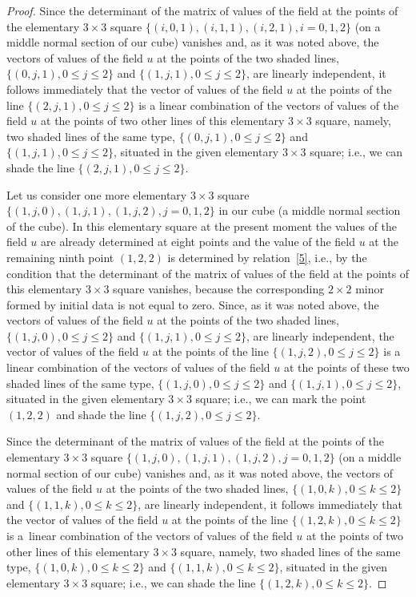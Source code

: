 \documentclass[11pt]{article}
\begin{document}
\begin{proof}
Since the determinant of the matrix of values of the f\/ield at the
points of the elementary $3 \times 3$ square $\{(i, 0, 1), (i, 1,
1), (i, 2, 1), i = 0, 1, 2\}$ (on a middle normal section of our
cube) vanishes and, as it was noted above, the vectors of values of
the f\/ield $u$ at the points of the two shaded lines, $\{(0, j, 1), 0
\leq j \leq 2\}$ and $\{(1, j, 1), 0 \leq j \leq 2\}$, are linearly
independent, it follows immediately that the vector of values of the
f\/ield $u$ at the points of the line $\{(2, j, 1), 0 \leq j \leq 2\}$
is a linear combination of the vectors of values of the f\/ield $u$ at
the points of two other lines of this elementary $3 \times 3$
square, namely, two shaded lines of the same type, $\{(0, j, 1), 0
\leq j \leq 2\}$ and $\{(1, j, 1), 0 \leq j \leq 2\}$, situated in
the given elementary $3 \times 3$ square; i.e., we can shade the
line $\{(2, j, 1), 0 \leq j \leq 2\}$.


Let us consider one more elementary $3 \times 3$ square $\{(1, j,
0), (1, j, 1), (1, j, 2), j = 0, 1, 2\}$ in our cube (a middle
normal section of the cube). In this elementary square at the
present moment the values of the f\/ield $u$ are already determined at
eight points and the value of the f\/ield $u$ at the remaining ninth
point $(1, 2, 2)$ is determined by relation~\eqref{5}, i.e.,
by the condition that the determinant of the matrix of values of the
f\/ield at the points of this elementary $3 \times 3$ square vanishes,
because the corresponding $2 \times 2$ minor formed by initial data
is not equal to zero. Since, as it was noted above, the vectors of
values of the f\/ield $u$ at the points of the two shaded lines,
$\{(1, j, 0), 0 \leq j \leq 2\}$ and $\{(1, j, 1), 0 \leq j \leq
2\}$, are linearly independent, the vector of values of the f\/ield
$u$ at the points of the line $\{(1, j, 2), 0 \leq j \leq 2\}$ is a
linear combination of the vectors of values of the f\/ield $u$ at the
points of these two shaded lines of the same type, $\{(1, j, 0), 0
\leq j \leq 2\}$ and $\{(1, j, 1), 0 \leq j \leq 2\}$, situated in
the given elementary $3 \times 3$ square; i.e., we can mark the
point $(1, 2, 2)$ and shade the line $\{(1, j, 2), 0 \leq j \leq
2\}$.


Since the determinant of the matrix of values of the f\/ield at the
points of the elementary $3 \times 3$ square $\{(1, j, 0), (1, j,
1), (1, j, 2), j = 0, 1, 2\}$ (on a middle normal section of our
cube) vanishes and, as it was noted above, the vectors of values of
the f\/ield $u$ at the points of the two shaded lines, $\{(1, 0, k), 0
\leq k \leq 2\}$ and $\{(1, 1, k), 0 \leq k \leq 2\}$, are linearly
independent, it follows immediately that the vector of values of the
f\/ield $u$ at the points of the line $\{(1, 2, k), 0 \leq k \leq 2\}$
is a~linear combination of the vectors of values of the f\/ield $u$ at
the points of two other lines of this elementary $3 \times 3$
square, namely, two shaded lines of the same type, $\{(1, 0, k), 0
\leq k \leq 2\}$ and $\{(1, 1, k), 0 \leq k \leq 2\}$, situated in
the given elementary $3 \times 3$ square; i.e., we can shade the
line $\{(1, 2, k), 0 \leq k \leq 2\}$.



\end{proof}
\end{document}
